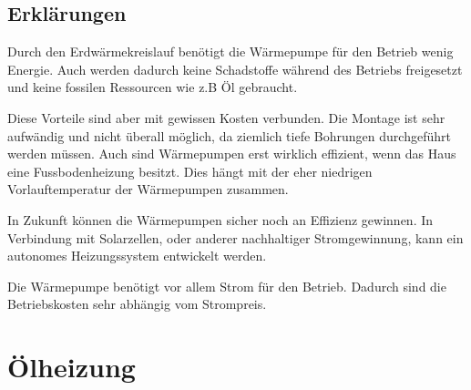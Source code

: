 \subsection{Erklärungen}

Durch den Erdwärmekreislauf benötigt die Wärmepumpe für den Betrieb wenig Energie. Auch werden dadurch keine Schadstoffe während des Betriebs freigesetzt und keine fossilen Ressourcen wie z.B Öl gebraucht.

Diese Vorteile sind aber mit gewissen Kosten verbunden. Die Montage ist sehr aufwändig und nicht überall möglich, da ziemlich tiefe Bohrungen durchgeführt werden müssen. Auch sind Wärmepumpen erst wirklich effizient, wenn das Haus eine Fussbodenheizung besitzt. Dies hängt mit der eher niedrigen Vorlauftemperatur der Wärmepumpen zusammen.

In Zukunft können die Wärmepumpen sicher noch an Effizienz gewinnen. In Verbindung mit Solarzellen, oder anderer nachhaltiger Stromgewinnung, kann ein autonomes Heizungssystem entwickelt werden.

Die Wärmepumpe benötigt vor allem Strom für den Betrieb. Dadurch sind die Betriebskosten sehr abhängig vom Strompreis. 

\newpage

\section{Ölheizung}

